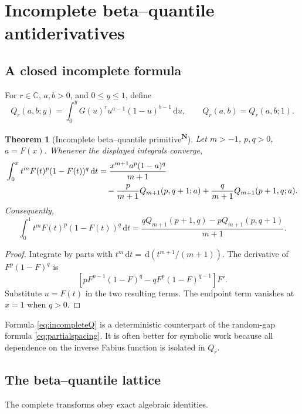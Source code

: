 \documentclass[11pt,oneside]{article}
\newtheorem{theorem}{Theorem}[section]
\theoremstyle{definition}
\theoremstyle{remark}
\newcommand{\F}{F}
\newcommand{\G}{G}
\newcommand{\C}{\mathbb C}
\newcommand{\dd}{\,\mathrm d}
\newcommand{\tagnew}{\textsuperscript{\textcolor{oliveink}{\bfseries N}}}
\begin{document}
\section{Incomplete beta--quantile antiderivatives}

\subsection{A closed incomplete formula}

For \(r\in\C\), \(a,b>0\), and \(0\le y\le1\), define
\begin{equation}\label{eq:Qdef}
 Q_r(a,b;y)=\int_0^y\G(u)^r u^{a-1}(1-u)^{b-1}\dd u,
 \qquad Q_r(a,b)=Q_r(a,b;1).
\end{equation}

\begin{theorem}[Incomplete beta--quantile primitive\tagnew]\label{thm:incompleteQ}
Let \(m>-1\), \(p,q>0\), \(a=\F(x)\).  Whenever the displayed integrals
converge,
\begin{align}
 \int_0^x t^m\F(t)^p(1-\F(t))^q\dd t
 &=\frac{x^{m+1}a^p(1-a)^q}{m+1}\notag\\
 &\quad-\frac{p}{m+1}Q_{m+1}(p,q+1;a)
 +\frac{q}{m+1}Q_{m+1}(p+1,q;a).
 \label{eq:incompleteQ}
\end{align}
Consequently,
\begin{equation}\label{eq:defQ}
 \int_0^1 t^m\F(t)^p(1-\F(t))^q\dd t
 =\frac{qQ_{m+1}(p+1,q)-pQ_{m+1}(p,q+1)}{m+1}.
\end{equation}
\end{theorem}

\begin{proof}
Integrate by parts with \(t^m\dd t=\dd(t^{m+1}/(m+1))\).  The derivative of
\(\F^p(1-\F)^q\) is
\[
 \left[p\F^{p-1}(1-\F)^q-q\F^p(1-\F)^{q-1}\right]\F'.
\]
Substitute \(u=\F(t)\) in the two resulting terms.  The endpoint term vanishes
at \(x=1\) when \(q>0\).
\end{proof}

Formula \eqref{eq:incompleteQ} is a deterministic counterpart of the random-gap
formula \eqref{eq:partialspacing}.  It is often better for symbolic work because
all dependence on the inverse Fabius function is isolated in \(Q_r\).

\subsection{The beta--quantile lattice}

The complete transforms obey exact algebraic identities.
\end{document}
